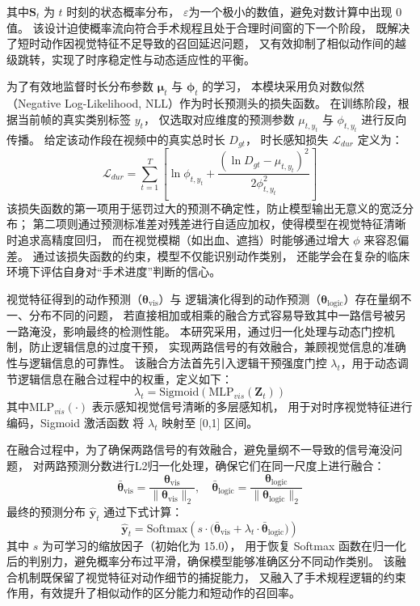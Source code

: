 其中\(\mathbf{S}_t\) 为 \(t\) 时刻的状态概率分布， 
\(\varepsilon\)为一个极小的数值，避免对数计算中出现 0 值。
该设计迫使概率流向符合手术规程且处于合理时间窗的下一个阶段，
既解决了短时动作因视觉特征不足导致的召回延迟问题，
又有效抑制了相似动作间的越级跳转，实现了时序稳定性与动态适应性的平衡。

为了有效地监督时长分布参数 \(\boldsymbol{\mu}_t\) 与 \(\boldsymbol{\phi}_t\) 的学习，
本模块采用负对数似然（Negative Log-Likelihood, NLL）作为时长预测头的损失函数。
在训练阶段，根据当前帧的真实类别标签 \(y_t\)，
仅选取对应维度的预测参数 \(\mu_{t, y_t}\) 与 \(\phi_{t, y_t}\) 进行反向传播。
给定该动作段在视频中的真实总时长 \(D_{gt}\)，
时长感知损失 \(\mathcal{L}_{dur}\) 定义为：
\begin{equation}
    \mathcal{L}_{dur} = \sum_{t=1}^T \left[ \ln \phi_{t, y_t} + 
    \frac{(\ln D_{gt} - \mu_{t, y_t})^2}{2\phi_{t, y_t}^2} \right]
\end{equation}
该损失函数的第一项用于惩罚过大的预测不确定性，防止模型输出无意义的宽泛分布；
第二项则通过预测标准差对残差进行自适应加权，使得模型在视觉特征清晰时追求高精度回归，
而在视觉模糊（如出血、遮挡）时能够通过增大 \(\phi\) 来容忍偏差。
通过该损失函数的约束，模型不仅能识别动作类别，
还能学会在复杂的临床环境下评估自身对“手术进度”判断的信心。


\textbf{\fusion}\quad
视觉特征得到的动作预测（\(\mathbf{\theta}_{\mathrm{vis}}\)）与
逻辑演化得到的动作预测（\(\mathbf{\theta}_{\mathrm{logic}}\)）存在量纲不一、分布不同的问题，
若直接相加或相乘的融合方式容易导致其中一路信号被另一路淹没，影响最终的检测性能。
本研究采用\fusion，通过归一化处理与动态门控机制，防止逻辑信息的过度干预，
实现两路信号的有效融合，兼顾视觉信息的准确性与逻辑信息的可靠性。
该融合方法首先引入逻辑干预强度门控 \(\lambda_t\)，用于动态调节逻辑信息在融合过程中的权重，定义如下：
\begin{equation}
    \lambda_t = \text{Sigmoid}(\mathrm{MLP}_{vis}(\mathbf{Z}_t))
\end{equation}
其中\(\mathrm{MLP}_{vis}(\cdot)\) 表示感知视觉信号清晰的多层感知机， 
用于对时序视觉特征进行编码，Sigmoid 激活函数
将 \(\lambda_t\) 映射至 [0,1] 区间。

在融合过程中，为了确保两路信号的有效融合，避免量纲不一导致的信号淹没问题，
对两路预测分数进行L2归一化处理，确保它们在同一尺度上进行融合：
\begin{equation}
\bar{\mathbf{\theta}}_{\mathrm{vis}} = 
\frac{\mathbf{\theta}_{\mathrm{vis}}}{\|\mathbf{\theta}_{\mathrm{vis}}\|_2}, 
\quad \bar{\mathbf{\theta}}_{\mathrm{logic}} = 
\frac{\mathbf{\theta}_{\mathrm{logic}}}{\|\mathbf{\theta}_{\mathrm{logic}}\|_2}
\end{equation}
最终的预测分布 \(\hat{\mathbf{y}}_t\) 通过下式计算：
\begin{equation}
\hat{\mathbf{y}}_t = \mathrm{Softmax}\left(s \cdot \big(\bar{\mathbf{\theta}}_{\mathrm{vis}} 
+ \lambda_t \cdot \bar{\mathbf{\theta}}_{\mathrm{logic}}\big)\right)
\label{eq:alg2_fusion}
\end{equation}
其中 \(s\) 为可学习的缩放因子（初始化为 15.0），
用于恢复 Softmax 函数在归一化后的判别力，避免概率分布过平滑，确保模型能够准确区分不同动作类别。
该融合机制既保留了视觉特征对动作细节的捕捉能力，
又融入了手术规程逻辑的约束作用，有效提升了相似动作的区分能力和短动作的召回率。

